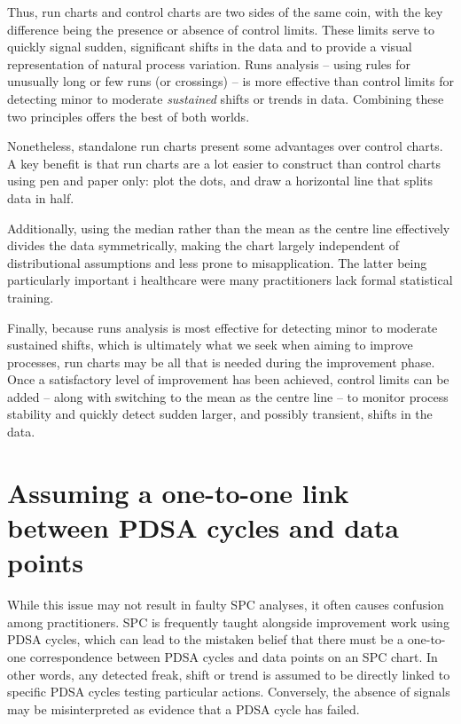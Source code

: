 \documentclass[
]{book}
\begin{document}
Thus, run charts and control charts are two sides of the same coin, with the key difference being the presence or absence of control limits. These limits serve to quickly signal sudden, significant shifts in the data and to provide a visual representation of natural process variation. Runs analysis -- using rules for unusually long or few runs (or crossings) -- is more effective than control limits for detecting minor to moderate \emph{sustained} shifts or trends in data. Combining these two principles offers the best of both worlds.

Nonetheless, standalone run charts present some advantages over control charts. A key benefit is that run charts are a lot easier to construct than control charts using pen and paper only: plot the dots, and draw a horizontal line that splits data in half.

Additionally, using the median rather than the mean as the centre line effectively divides the data symmetrically, making the chart largely independent of distributional assumptions and less prone to misapplication. The latter being particularly important i healthcare were many practitioners lack formal statistical training.

Finally, because runs analysis is most effective for detecting minor to moderate sustained shifts, which is ultimately what we seek when aiming to improve processes, run charts may be all that is needed during the improvement phase. Once a satisfactory level of improvement has been achieved, control limits can be added -- along with switching to the mean as the centre line -- to monitor process stability and quickly detect sudden larger, and possibly transient, shifts in the data.

\section{Assuming a one-to-one link between PDSA cycles and data points}\label{assuming-a-one-to-one-link-between-pdsa-cycles-and-data-points}

While this issue may not result in faulty SPC analyses, it often causes confusion among practitioners. SPC is frequently taught alongside improvement work using PDSA cycles, which can lead to the mistaken belief that there must be a one-to-one correspondence between PDSA cycles and data points on an SPC chart. In other words, any detected freak, shift or trend is assumed to be directly linked to specific PDSA cycles testing particular actions. Conversely, the absence of signals may be misinterpreted as evidence that a PDSA cycle has failed.
\end{document}
